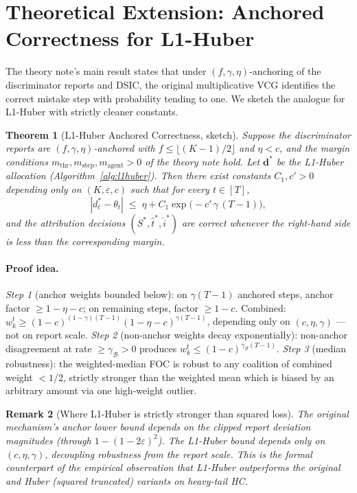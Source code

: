 \documentclass[11pt]{article}
\newtheorem{theorem}{Theorem}
\newtheorem{remark}[theorem]{Remark}
\newcommand{\db}{\bm{d}}
\begin{document}
\section{Theoretical Extension: Anchored Correctness for L1-Huber}
\label{sec:theory}

The theory note's main result states that under $(f, \gamma, \eta)$-anchoring
of the discriminator reports and DSIC, the original multiplicative VCG
identifies the correct mistake step with probability tending to one. We
sketch the analogue for L1-Huber with strictly cleaner constants.

\begin{theorem}[L1-Huber Anchored Correctness, sketch]
\label{thm:l1h-anchored}
Suppose the discriminator reports are $(f, \gamma, \eta)$-anchored with
$f \leq \lfloor (K{-}1)/2 \rfloor$ and $\eta < c$, and the margin conditions
$m_{\mathrm{thr}}, m_{\mathrm{step}}, m_{\mathrm{agent}} > 0$ of the theory
note hold. Let $\db^*$ be the L1-Huber allocation
(Algorithm~\ref{alg:l1huber}). Then there exist constants $C_1, c' > 0$
depending only on $(K, \varepsilon, c)$ such that for every $t \in [T]$,
\[
|d_t^* - \theta_t| \;\leq\; \eta + C_1 \exp\!\big(-c'\,\gamma\,(T-1)\big),
\]
and the attribution decisions $(S^*, \hat t^*, \hat i^*)$ are correct
whenever the right-hand side is less than the corresponding margin.
\end{theorem}

\paragraph{Proof idea.}
\emph{Step 1} (anchor weights bounded below): on $\gamma(T-1)$ anchored
steps, anchor factor $\geq 1 - \eta - c$; on remaining steps, factor
$\geq 1 - c$. Combined:
$w^t_k \geq (1-c)^{(1-\gamma)(T-1)} (1 - \eta - c)^{\gamma(T-1)}$, depending
only on $(c, \eta, \gamma)$ --- not on report scale.
\emph{Step 2} (non-anchor weights decay exponentially): non-anchor
disagreement at rate $\geq \gamma_{\mathcal B} > 0$ produces $w^t_k \leq
(1-c)^{\gamma_{\mathcal B}(T-1)}$.
\emph{Step 3} (median robustness): the weighted-median FOC is robust to any
coalition of combined weight $< 1/2$, strictly stronger than the weighted
mean which is biased by an arbitrary amount via one high-weight outlier.

\begin{remark}[Where L1-Huber is strictly stronger than squared loss]
The original mechanism's anchor lower bound depends on the clipped report
deviation magnitudes (through $1 - (1-2\varepsilon)^2$). The L1-Huber bound
depends only on $(c, \eta, \gamma)$, decoupling robustness from the report
scale. This is the formal counterpart of the empirical observation that
L1-Huber outperforms the original and Huber (squared truncated) variants on
heavy-tail HC.
\end{remark}
\end{document}

